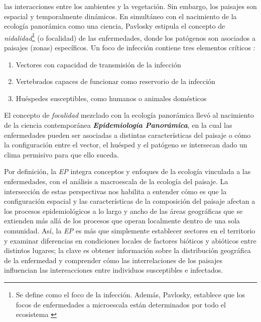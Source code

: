   las interacciones entre los ambientes y la vegetación.
  Sin embargo, los paisajes son espacial y temporalmente dinámicos.
  En simultáneo con el nacimiento de la ecología panorámica como una ciencia,
  Pavlosky estipula el concepto de \textit{nidalidad}\footnote{Se define como
  el foco de la infección. Además, Pavlosky, establece que los focos de
  enfermedades a microescala están determinados por todo el ecosistema \cite{nidality}}
  (o focalidad) de las enfermedades, donde los patógenos son asociados
  a paisajes (zonas) específicos. Un foco de infección contiene tres elementos
  críticos \cite{reisen_landscape}:
  \begin{enumerate}
    \item Vectores con capacidad de transmisión de la infección
    \item Vertebrados capaces de funcionar como reservorio de la infección
    \item Huéspedes susceptibles, como humanos o animales domésticos
  \end{enumerate}
  El concepto de \textit{focalidad} mezclado con la ecología panorámica
  llevó al nacimiento de la ciencia contemporánea
  \textbf{\textit{Epidemiología Panorámica}}, en la cual las enfermedades
  pueden ser asociadas a distintas características del paisaje o cómo
  la configuración entre el vector, el huésped y el patógeno se intersecan
  dado un clima permisivo para que ello suceda.

\par Por definición, la \textit{EP} integra conceptos y
  enfoques de la ecología vinculada a las enfermedades, con el análisis a
  macroescala de la ecología del paisaje. La intersección de estas perspectivas
  nos habilita a entender cómo es que la configuración espacial y las
  características de la composición del paisaje afectan a los procesos
  epidemiológicos a lo largo y ancho de las áreas geográficas que se
  extienden más allá de los procesos que operan localmente dentro de una sola comunidad.
  Así, la \textit{EP} es más que simplemente establecer
  sectores en el territorio y examinar diferencias en condiciones locales de
  factores bióticos y abióticos entre distintos lugares; la clave es obtener
  información sobre la distribución geográfica de la enfermedad y comprender
  cómo las interrelaciones de los paisajes influencian las intereacciones entre
  individuos susceptibles e infectados.

